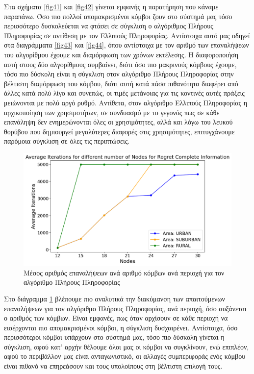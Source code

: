 Στα σχήματα \ref{fig41} και \ref{fig42} γίνεται εμφανής η παρατήρηση που κάναμε παραπάνω. Όσο πιο πολλοί απομακρισμένοι κόμβοι ζουν στο σύστημά μας τόσο περισσότερο δυσκολεύεται να φτάσει σε σύγκλιση ο αλγόριθμος Πλήρους Πληροφορίας σε αντίθεση με τον Ελλιπούς Πληροφορίας. Αντίστοιχα αυτό μας οδηγεί στα διαγράμματα \ref{fig43} και \ref{fig44}, όπου αντίστοιχα με τον αριθμό των επαναλήψεων του αλγορίθμου έχουμε και διαμόρφωση των χρόνων εκτέλεσης. Η διαφοροποιήση αυτή στους δύο αλγορίθμους συμβαίνει, διότι όσο πιο μακρινούς κόμβους έχουμε, τόσο πιο δύσκολη είναι η σύγκλιση στον αλγόριθμο Πλήρους Πληροφορίας στην βέλτιστη διαμόρφωση του κόμβου, διότι αυτή κατά πάσα πιθανότητα διαφέρει από άλλες κατά πολύ λίγο και συνεπώς, οι τιμές μετάνοιας για τις κοντινές αυτές πράξεις μειώνονται με πολύ αργό ρυθμό. Αντίθετα, στον αλγόριθμο Ελλιπούς Πληροφορίας η αρχικοποίηση των χρησιμοτήτων, σε συνδυασμό με το γεγονός πως σε κάθε επανάληψη δεν ενημερώνονται όλες οι χρησιμότητες, αλλά και λόγω του λευκού θορύβου που δημιουργεί μεγαλύτερες διαφορές στις χρησιμότητες, επιτυγχάνουμε παρόμοια σύγκλιση σε όλες τις περιπτώσεις.

\newpage

\begin{figure}[ht]
    \centering
    \includegraphics[width=\textwidth]{figures/chapter4/RCI_Iterations_vs_Users_per_Area.png}
    \caption{Μέσος αριθμός επαναλήψεων ανά αριθμό κόμβων ανά περιοχή για τον αλγόριθμο Πλήρους Πληροφορίας}
    \label{fig45}
\end{figure}

Στο διάγραμμα \ref{fig45} βλέπουμε πιο αναλυτικά την διακύμανση των απαιτούμενων επαναλήψεων για τον αλγόριθμο Πλήρους Πληροφορίας, ανά περιοχή, όσο αυξάνεται ο αριθμός των κόμβων. Είναι εμφανές, πως όταν αρχίσουν σε κάθε περιοχή να εισέρχονται πιο απομακρισμένοι κόμβοι, η σύγκλιση δυσχαιρένει. Αντίστοιχα, όσο περισσότεροι κόμβοι υπάρχουν στο σύστημά μας, τόσο πιο δύσκολη γίνεται η σύγκλιση, αφού κατ' αρχήν θέλουμε όλοι μας οι κόμβοι να συγκλίνουν, ενώ επιπλέον, αφού το περιβάλλον μας είναι ανταγωνιστικό, οι αλλαγές συμπεριφοράς ενός κόμβου είναι πιθανό να επηρεάσουν και τους υπολοίπους στη βέλτιστη επιλογή τους.